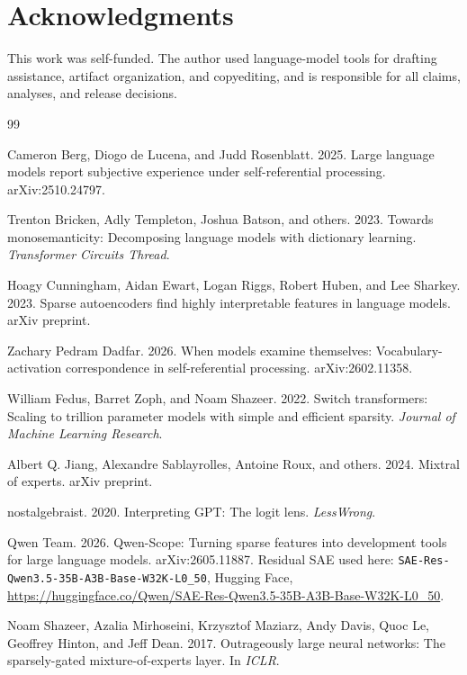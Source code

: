 \documentclass[10pt,a4paper,twocolumn]{article}
\begin{document}
\section*{Acknowledgments}

This work was self-funded. The author used language-model tools for drafting
assistance, artifact organization, and copyediting, and is responsible for all
claims, analyses, and release decisions.

\begin{thebibliography}{99}

Cameron Berg, Diogo de Lucena, and Judd Rosenblatt. 2025. Large language models
report subjective experience under self-referential processing.
arXiv:2510.24797.

Trenton Bricken, Adly Templeton, Joshua Batson, and others. 2023. Towards
monosemanticity: Decomposing language models with dictionary learning.
\emph{Transformer Circuits Thread}.

Hoagy Cunningham, Aidan Ewart, Logan Riggs, Robert Huben, and Lee Sharkey. 2023.
Sparse autoencoders find highly interpretable features in language models.
arXiv preprint.

Zachary Pedram Dadfar. 2026. When models examine themselves:
Vocabulary-activation correspondence in self-referential processing.
arXiv:2602.11358.

William Fedus, Barret Zoph, and Noam Shazeer. 2022. Switch transformers: Scaling
to trillion parameter models with simple and efficient sparsity. \emph{Journal of
Machine Learning Research}.

Albert Q. Jiang, Alexandre Sablayrolles, Antoine Roux, and others. 2024. Mixtral
of experts. arXiv preprint.

nostalgebraist. 2020. Interpreting GPT: The logit lens. \emph{LessWrong}.

Qwen Team. 2026. Qwen-Scope: Turning sparse features into development tools for
large language models. arXiv:2605.11887. Residual SAE used here:
\texttt{SAE-Res-Qwen3.5-35B-A3B-Base-W32K-L0\_50}, Hugging Face,
\url{https://huggingface.co/Qwen/SAE-Res-Qwen3.5-35B-A3B-Base-W32K-L0_50}.

Noam Shazeer, Azalia Mirhoseini, Krzysztof Maziarz, Andy Davis, Quoc Le, Geoffrey
Hinton, and Jeff Dean. 2017. Outrageously large neural networks: The
sparsely-gated mixture-of-experts layer. In \emph{ICLR}.


\end{thebibliography}
\end{document}
